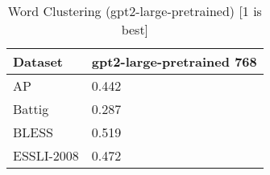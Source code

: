 \begin{table}[]
\centering
\begin{tabular}{l|l}
\hline
Dataset & gpt2-large-pretrained 768 \\
\hline
AP & 0.442 \\ 
Battig & 0.287 \\ 
BLESS & 0.519 \\ 
ESSLI-2008 & 0.472
\end{tabular}
\caption{Word Clustering (gpt2-large-pretrained) [1 is best]}
\label{tab:cluster-gpt2-large-pretrained}
\end{table}
